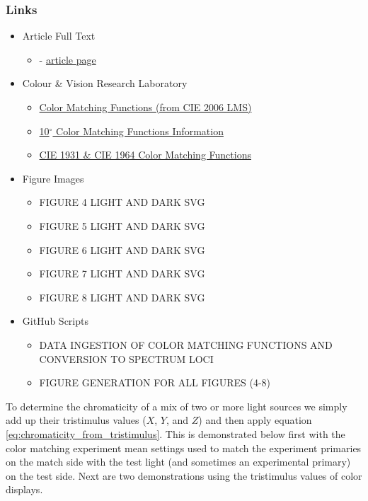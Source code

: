 \documentclass[twocolumn]{article}
\begin{document}
\subsubsection{Links}
\begin{itemize}
    \item Article Full Text
    \begin{itemize}
        \item \cite{sharpe2011luminous} - \href{http://www.cvrl.org/people/Stockman/pubs/2011\%20Vstar\%20correction\%20SSJJ.pdf}{article page}
    \end{itemize}
    \item Colour \& Vision Research Laboratory
    \begin{itemize}
        \item \href{http://www.cvrl.org/ciexyzpr.htm}{Color Matching Functions (from CIE 2006 LMS)}
        \item \href{http://www.cvrl.org/database/text/cienewxyz/cie2012xyz10.htm}{10$^\circ$ Color Matching Functions Information}
        \item \href{http://www.cvrl.org/cie.htm}{CIE 1931 \& CIE 1964 Color Matching Functions}
    \end{itemize}
    \item Figure Images
    \begin{itemize}
        \item FIGURE 4 LIGHT AND DARK SVG
        \item FIGURE 5 LIGHT AND DARK SVG
        \item FIGURE 6 LIGHT AND DARK SVG
        \item FIGURE 7 LIGHT AND DARK SVG
        \item FIGURE 8 LIGHT AND DARK SVG
    \end{itemize}
    \item GitHub Scripts
    \begin{itemize}
        \item DATA INGESTION OF COLOR MATCHING FUNCTIONS AND CONVERSION TO SPECTRUM LOCI
        \item FIGURE GENERATION FOR ALL FIGURES (4-8)
    \end{itemize}
\end{itemize}
To determine the chromaticity of a mix of two or more light sources we simply add up their tristimulus values ($X$, $Y$, and $Z$) and then apply equation \ref{eq:chromaticity_from_tristimulus}.  This is demonstrated below first with the color matching experiment mean settings used to match the experiment primaries on the match side with the test light (and sometimes an experimental primary) on the test side.  Next are two demonstrations using the tristimulus values of color displays.
\end{document}
